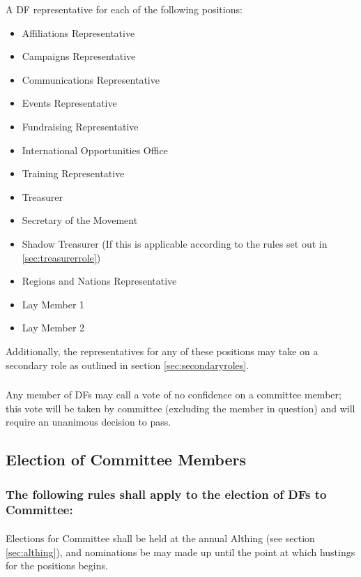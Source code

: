 \documentclass[a4paper, 12pt]{article}
\begin{document}
A DF representative for each of the following positions:
\begin{itemize}
\item Affiliations Representative
\item Campaigns Representative
\item Communications Representative
\item Events Representative
\item Fundraising Representative
\item International Opportunities Office
\item Training Representative
\item Treasurer
\item Secretary of the Movement
\item Shadow Treasurer (If this is applicable according to the rules set out in \ref{sec:treasurerrole})
\item Regions and Nations Representative
\item Lay Member 1
\item Lay Member 2
\end{itemize}

Additionally, the representatives for any of these positions may take on a secondary role as outlined in section \ref{sec:secondaryroles}.

\subsubsection{}
Any member of DFs may call a vote of no confidence on a committee member; this vote will be taken by committee (excluding the member in question) and will require an unanimous decision to pass.

\subsection{Election of Committee Members}
\label{sec:election}
\subsubsection{The following rules shall apply to the election of DFs to Committee:}
\paragraph{}
Elections for Committee shall be held at the annual Althing (see section \ref{sec:althing}), and nominations be may made up until the point at which hustings for the positions begins.
\end{document}
